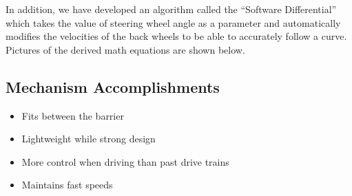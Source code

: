

In addition, we have developed an algorithm called the “Software Differential” which takes the value of steering wheel angle as a parameter and automatically modifies the velocities of the back wheels to be able to accurately follow a curve. Pictures of the derived math equations are shown below.


\subsection*{Mechanism Accomplishments}
\begin{itemize}
    \item Fits between the barrier
    \item Lightweight while strong design
    \item More control when driving than past drive trains
    \item Maintains fast speeds
\end{itemize} 

